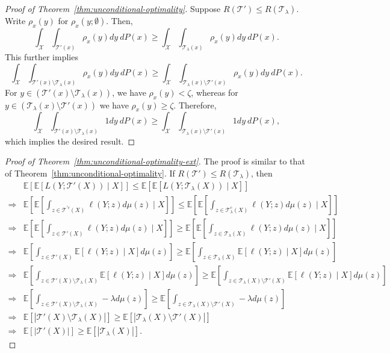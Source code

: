 \documentclass[10pt]{article}
\def\E{\mathbb{E}}
\newcommand{\X}{\mathcal{X}}
\newcommand{\T}{\mathcal{T}}
\begin{document}
\begin{proof}[Proof of Theorem~\ref{thm:unconditional-optimality}]
Suppose $R(\T') \le R(\T_\lambda)$. Write $\rho_x(y)$ for $\rho_x(y; \emptyset)$. Then,
\begin{equation*}
    \int_{\X} \int_{\T'(x)} \rho_x(y) dy \ dP(x) \ge  \int_{\X} \int_{\T_\lambda(x)} \rho_x(y) dy \ dP(x). 
\end{equation*}
This further implies 
\begin{equation*}
    \int_{\X} \int_{\T'(x) \setminus \T_\lambda(x)} \rho_x(y) dy \ dP(x) \ge  \int_{\X} \int_{\T_\lambda(x) \setminus \T'(x)} \rho_x(y) dy \ dP(x). 
\end{equation*}
For $y \in (\T'(x) \setminus \T_\lambda(x))$, we have $\rho_x(y) < \zeta$, whereas for $y \in (\T_\lambda(x) \setminus \T'(x))$ we have $\rho_x(y) \ge \zeta$. Therefore,
\begin{equation*}
    \int_{\X} \int_{\T'(x) \setminus \T_\lambda(x)} 1 dy \ dP(x) \ge  \int_{\X} \int_{\T_\lambda(x) \setminus \T'(x)} 1 dy \ dP(x), 
\end{equation*}
which implies the desired result.
\end{proof}

\begin{proof}[Proof of Theorem~\ref{thm:unconditional-optimality-ext}]
The proof is similar to that of Theorem~\ref{thm:unconditional-optimality}. If $R(\T') \le R(\T_\lambda)$, then
\begin{align*}
    &\E\left[\E\left[L(Y; \T'(X))\mid X\right]\right] \le \E\left[\E\left[L(Y; \T_\lambda(X))\mid X\right]\right]\\
    \Longrightarrow & \E\left[\E\left[\int_{z\in \T^{'c}(X)}\ell(Y; z)d\mu(z)\mid X\right]\right]\le \E\left[\E\left[\int_{z\in \T_\lambda^{c}(X)}\ell(Y; z)d\mu(z)\mid X\right]\right]\\
    \Longrightarrow & \E\left[\E\left[\int_{z\in \T'(X)}\ell(Y; z)d\mu(z) \mid X\right]\right]\ge \E\left[\E\left[\int_{z\in \T_\lambda(X)}\ell(Y; z)d\mu(z)\mid X\right]\right]\\
    \Longrightarrow & \E\left[\int_{z\in \T'(X)}\E\left[\ell(Y; z) \mid X\right]d\mu(z)\right]\ge \E\left[\int_{z\in \T_\lambda(X)}\E\left[\ell(Y; z)\mid X\right]d\mu(z)\right]\\
    \Longrightarrow & \E\left[\int_{z\in \T'(X)\setminus \T_\lambda(X)}\E\left[\ell(Y; z) \mid X\right]d\mu(z)\right]\ge \E\left[\int_{z\in \T_\lambda(X) \setminus \T'(X)}\E\left[\ell(Y; z)\mid X\right]d\mu(z)\right]\\
    \Longrightarrow & \E\left[\int_{z\in \T'(X)\setminus \T_\lambda(X)}-\lambda d\mu(z)\right]\ge \E\left[\int_{z\in \T_\lambda(X) \setminus \T'(X)}-\lambda d\mu(z)\right]\\
    \Longrightarrow & \E[|\T'(X)\setminus \T_\lambda(X)|]\ge \E[|\T_\lambda(X)\setminus \T'(X)|]\\
    \Longrightarrow & \E[|\T'(X)|]\ge \E[|\T_\lambda(X)|].
\end{align*}
\end{proof}
\end{document}

